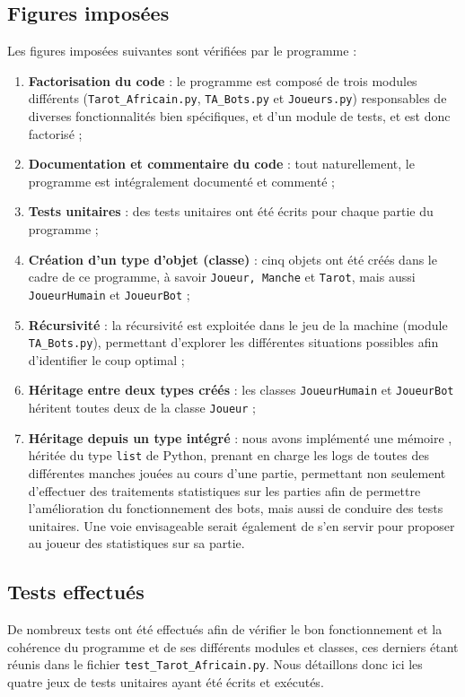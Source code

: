    \subsection{Figures imposées}\label{subsec:figures-imposées}
      Les figures imposées suivantes sont vérifiées par le programme :
      \begin{enumerate}
         \item \textbf{Factorisation du code} : le programme est composé de trois modules différents (\texttt{Tarot\_Africain.py}, \texttt{TA\_Bots.py} et \texttt{Joueurs.py}) responsables de diverses fonctionnalités bien spécifiques, et d'un module de tests, et est donc factorisé ;
         \item \textbf{Documentation et commentaire du code} : tout naturellement, le programme est intégralement documenté et commenté ;
         \item \textbf{Tests unitaires} : des tests unitaires ont été écrits pour chaque partie du programme ;
         \item \textbf{Création d'un type d'objet (classe)} : cinq objets ont été créés dans le cadre de ce programme, à savoir \texttt{Joueur, Manche} et \texttt{Tarot}, mais aussi \texttt{JoueurHumain} et \texttt{JoueurBot} ;
         \item \textbf{Récursivité} : la récursivité est exploitée dans le jeu de la machine (module \texttt{TA\_Bots.py}), permettant d'explorer les différentes situations possibles afin d'identifier le coup optimal ;
         \item \textbf{Héritage entre deux types créés} : les classes \texttt{JoueurHumain} et \texttt{JoueurBot} héritent toutes deux de la classe \texttt{Joueur} ;
         \item \textbf{Héritage depuis un type intégré} : nous avons implémenté une \og mémoire \fg{}, héritée du type \texttt{list} de Python, prenant en charge les logs de toutes des différentes manches jouées au cours d'une partie, permettant non seulement d'effectuer des traitements statistiques sur les parties afin de permettre l'amélioration du fonctionnement des bots, mais aussi de conduire des tests unitaires.
         Une voie envisageable serait également de s'en servir pour proposer au joueur des statistiques sur sa partie.
      \end{enumerate}

   \subsection{Tests effectués}\label{subsec:tests-effectués}
      De nombreux tests ont été effectués afin de vérifier le bon fonctionnement et la cohérence du programme et de ses différents modules et classes, ces derniers étant réunis dans le fichier \texttt{test\_Tarot\_Africain.py}.
      Nous détaillons donc ici les quatre jeux de tests unitaires ayant été écrits et exécutés.

